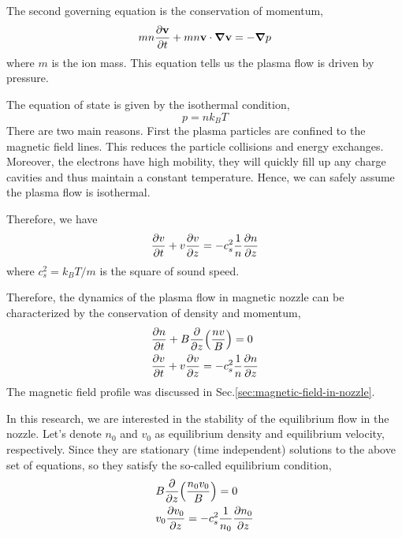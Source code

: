 The second governing equation is the conservation of momentum,
\[ mn\pdv{\mathbf{v}}{t} + mn\mathbf{v}\cdot\grad\mathbf{v} = -\grad p \]
where $m$ is the ion mass. This equation tells us the plasma flow is driven by pressure.

The equation of state is given by the isothermal condition,
\begin{equation} \label{eq:eos}
	p = nk_BT
\end{equation}
There are two main reasons. First the plasma particles are confined to the magnetic field lines. This reduces the particle collisions and energy exchanges. Moreover, the electrons have high mobility, they will quickly fill up any charge cavities and thus maintain a constant temperature. Hence, we can safely assume the plasma flow is isothermal.

Therefore, we have
\begin{equation}
	\pdv{v}{t} + v\pdv{v}{z} = -c_s^2\frac{1}{n}\pdv{n}{z}
\end{equation}
where $c_s^2 = k_BT/m$ is the square of sound speed.

Therefore, the dynamics of the plasma flow in magnetic nozzle can be characterized by the conservation of density and momentum,
\begin{align*}
	 & \pdv{n}{t} + B\pdv{z}(\frac{nv}{B}) = 0                \\
	 & \pdv{v}{t} + v\pdv{v}{z} = -c_s^2\frac{1}{n}\pdv{n}{z}
\end{align*}
The magnetic field profile was discussed in Sec.\ref{sec:magnetic-field-in-nozzle}.

In this research, we are interested in the stability of the equilibrium flow in the nozzle. Let's denote $n_0$ and $v_0$ as equilibrium density and equilibrium velocity, respectively. Since they are stationary (time independent) solutions to the above set of equations, so they satisfy the so-called equilibrium condition,
\begin{align*}
	 & B\pdv{z}(\frac{n_0v_0}{B})  = 0                   \\
	 & v_0\pdv{v_0}{z} = -c_s^2\frac{1}{n_0}\pdv{n_0}{z}
\end{align*}

